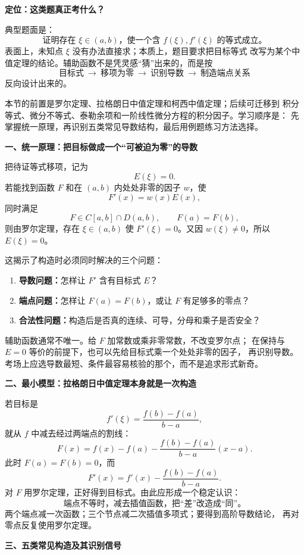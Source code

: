 \begin{knowledgeBox}
\textbf{定位：这类题真正考什么？}

典型题面是：
\[
\text{证明存在 }\xi\in(a,b)\text{，使一个含 }f(\xi),f'(\xi)
\text{ 的等式成立。}
\]
表面上，未知点 \(\xi\) 没有办法直接求；本质上，题目要求把目标等式
改写为某个中值定理的结论。辅助函数不是凭灵感“猜”出来的，而是按
\[
\boxed{\text{目标式}\ \longrightarrow\ \text{移项为零}\
\longrightarrow\ \text{识别导数}\ \longrightarrow\ \text{制造端点关系}}
\]
反向设计出来的。

本节的前置是罗尔定理、拉格朗日中值定理和柯西中值定理；后续可迁移到
积分等式、微分不等式、泰勒余项和一阶线性微分方程的积分因子。学习顺序是：
先掌握统一原理，再识别五类常见导数结构，最后用例题练习方法选择。

\textbf{一、统一原理：把目标做成一个“可被迫为零”的导数}

把待证等式移项，记为
\[
E(\xi)=0.
\]
若能找到函数 \(F\) 和在 \((a,b)\) 内处处非零的因子 \(w\)，使
\[
F'(x)=w(x)E(x),
\]
同时满足
\[
F\in C[a,b]\cap D(a,b),\qquad F(a)=F(b),
\]
则由罗尔定理，存在 \(\xi\in(a,b)\) 使 \(F'(\xi)=0\)。又因
\(w(\xi)\ne0\)，所以 \(E(\xi)=0\)。

这揭示了构造时必须同时解决的三个问题：
\begin{enumerate}
  \item \textbf{导数问题：}怎样让 \(F'\) 含有目标式 \(E\)？
  \item \textbf{端点问题：}怎样让 \(F(a)=F(b)\)，或让 \(F\) 有足够多的零点？
  \item \textbf{合法性问题：}构造后是否真的连续、可导，分母和乘子是否安全？
\end{enumerate}

辅助函数通常不唯一。给 \(F\) 加常数或乘非零常数，不改变罗尔点；
在保持与 \(E=0\) 等价的前提下，也可以先给目标式乘一个处处非零的因子，
再识别导数。考场上应选导数最短、条件最容易核验的那个，而不是追求形式新奇。

\textbf{二、最小模型：拉格朗日中值定理本身就是一次构造}

若目标是
\[
f'(\xi)=\frac{f(b)-f(a)}{b-a},
\]
就从 \(f\) 中减去经过两端点的割线：
\[
F(x)=f(x)-f(a)-\frac{f(b)-f(a)}{b-a}(x-a).
\]
此时 \(F(a)=F(b)=0\)，而
\[
F'(x)=f'(x)-\frac{f(b)-f(a)}{b-a}.
\]
对 \(F\) 用罗尔定理，正好得到目标式。由此应形成一个稳定认识：
\[
\boxed{\text{端点不等时，减去插值函数，把“差”改造成“同”。}}
\]
两个端点减一次函数；三个节点减二次插值多项式；要得到高阶导数结论，
再对零点反复使用罗尔定理。

\textbf{三、五类常见构造及其识别信号}


\end{knowledgeBox}
